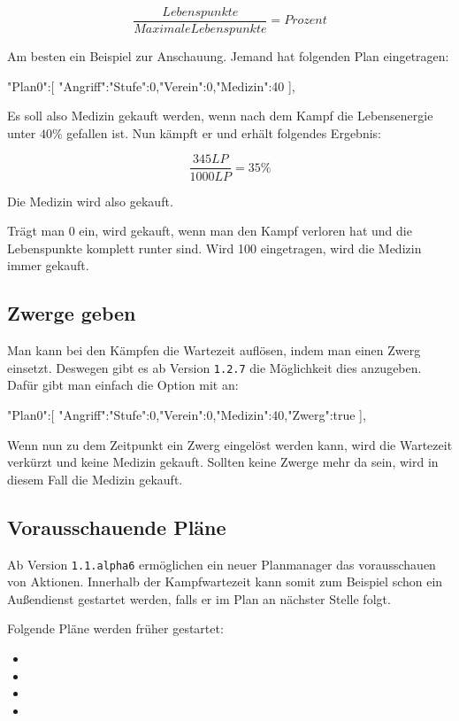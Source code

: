 \documentclass{scrartcl}
\begin{document}
$$\frac{Lebenspunkte}{Maximale Lebenspunkte}=Prozent$$

Am besten ein Beispiel zur Anschauung. Jemand hat folgenden Plan eingetragen:

\begin{code}[language=bash,emph={Medizin}]
"Plan0":[
	{"Angriff":{"Stufe":0,"Verein":0,"Medizin":40}}
],
\end{code}

Es soll also Medizin gekauft werden, wenn nach dem Kampf die Lebensenergie unter $40\%$ gefallen ist. Nun kämpft er und erhält folgendes Ergebnis:

$$\frac{345LP}{1000LP} = 35\%$$

Die Medizin wird also gekauft. 

Trägt man 0 ein, wird gekauft, wenn man den Kampf verloren hat und die Lebenspunkte komplett runter sind. Wird 100 eingetragen, wird die Medizin immer gekauft.


\subsection{Zwerge geben}
\label{Zwerg}
Man kann bei den Kämpfen die Wartezeit auflösen, indem man einen Zwerg einsetzt.
Deswegen gibt es ab Version \texttt{1.2.7} die Möglichkeit dies anzugeben. Dafür
gibt man einfach die Option mit an:

\begin{code}[language=bash,emph={Medizin}]
"Plan0":[
	{"Angriff":{"Stufe":0,"Verein":0,"Medizin":40,"Zwerg":true}}
],
\end{code}

Wenn nun zu dem Zeitpunkt ein Zwerg eingelöst werden kann, wird die Wartezeit
verkürzt und keine Medizin gekauft. Sollten keine Zwerge mehr da sein, wird in
diesem Fall die Medizin gekauft.



\subsection{Vorausschauende Pläne}
\label{Vorausschauen}

Ab Version \texttt{1.1.alpha6} ermöglichen ein neuer Planmanager das vorausschauen von Aktionen. Innerhalb der Kampfwartezeit kann somit zum Beispiel schon ein Außendienst gestartet werden, falls er im Plan an nächster Stelle folgt. 

Folgende Pläne werden früher gestartet:
\begin{itemize}
  \item {}
  \item {}
  \item {}
  \item {}
\end{itemize}
\end{document}
